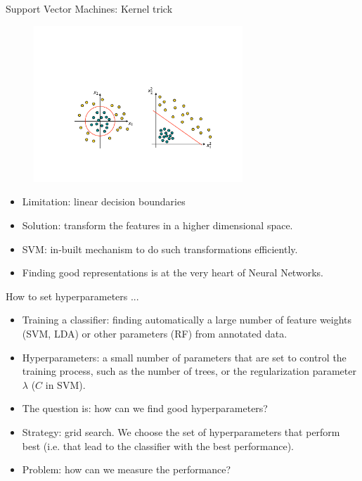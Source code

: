 \documentclass[xcolor=pdftex,dvipsnames,table]{beamer}
\begin{document}
\begin{frame}{Support Vector Machines: Kernel trick}
	\begin{figure}[htb]
		\includegraphics[width=0.7\textwidth]{../graphics/KernelTrick.pdf}
	\end{figure}
	\begin{itemize}
		\item Limitation: linear decision boundaries
		\item Solution: transform the features in a higher dimensional space.
		\item SVM: in-built mechanism to do such transformations efficiently.
		\item Finding good representations is at the very heart of Neural Networks. 
	\end{itemize}
\end{frame}

\begin{frame}{How to set hyperparameters ... }
	\begin{itemize}
		\item Training a classifier: finding automatically a large number of feature weights (SVM, LDA) or other parameters (RF) from annotated data.
		\item Hyperparameters: a small number of parameters that are set to control the training process, such as the number of trees, or the regularization parameter $\lambda$ ($C$ in SVM).
		\item The question is: how can we find good hyperparameters?
		\item Strategy: grid search. We choose the set of hyperparameters that perform best (i.e. that lead to the classifier with the best performance).
		\item Problem: how can we measure the performance?
	\end{itemize}
\end{frame}
\end{document}
